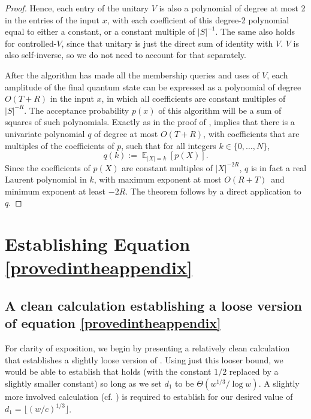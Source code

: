 \documentclass[10pt,a4paper]{article}
\newcommand{\<}{\langle}
\renewcommand{\>}{\rangle}
\DeclareMathOperator{\E}{\mathbb E}
\begin{document}
\begin{proof}
Hence, each entry of the unitary $V$ is also a polynomial of degree at most 2 in the entries of the input $x$,
with each coefficient of this degree-2 polynomial equal
to either a constant, or a constant multiple of $|S|^{-1}$. The same also holds for controlled-$V$, since that unitary is just the direct sum of identity with $V$. $V$ is also self-inverse, so we do not need to account for that separately.

After the algorithm has made all the membership queries and uses of $V$, each amplitude of the final quantum state can be expressed as a polynomial of degree $O(T + R)$ in the input $x$, in which all coefficients are constant multiples of $|S|^{-R}$. The acceptance probability $p(x)$ of this algorithm will be a sum of squares of such polynomials. 
Exactly
as in the proof of ,
 implies that there is a univariate polynomial
$q$ of degree at most $O(T+R)$, with coefficients that are multiples
of the coefficients of $p$, such that for all integers $k \in \{0, \dots, N\}$, 
\begin{equation}
q\left(  k\right)  :=\E_{\left\vert X\right\vert =k}\left[
p\left(  X\right)  \right]  .
\end{equation}
Since the coefficients of $p(X)$ are constant multiples of $|X|^{-2R}$, 
$q$ is in fact a real Laurent polynomial in $k$, with maximum exponent at most $O(R+T)$\ and minimum exponent at
least $-2R$.
The theorem follows by a direct 
application  to $q$.
\end{proof}
%

\appendix
\section{Establishing Equation \protect\ref*{provedintheappendix}}

\label{app}

%
\subsection{A clean calculation establishing a loose version of equation
\protect\ref*{provedintheappendix}}

For clarity of exposition, we begin by presenting a relatively clean
calculation that establishes a slightly loose version of 
. Using just this looser bound, we would be able to
establish that  holds (with the constant $1/2$
replaced by a slightly smaller constant) so long as we set $d_1$ to be $
\Theta\left(w^{1/3}/\log w \right)$. A slightly more involved calculation
(cf. ) is required to establish 
 for our desired value of $d_1= \lfloor (w/c)^{1/3}
\rfloor$.
\end{document}
